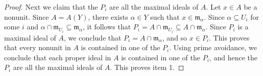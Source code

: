 \documentclass[preprint, 11pt,nonatbib]{elsarticle}
\theoremstyle{definition}
\numberwithin{theorem}{section}
\begin{document}
\begin{proof}

Next we claim that the $P_i$ are all the maximal ideals of $A$. 
Let $x \in A$ be a nonunit. Since $A = A (Y)$, there exists $\alpha \in Y$ such that $x \in \mathfrak{m}_{\alpha}$.
Since $\alpha \subseteq U_i$ for some $i$ and  $\alpha \cap \mathfrak{m}_{U_i} \subseteq \mathfrak{m}_{\alpha}$,
it follows that $ P_i = A \cap \mathfrak{m}_{U_i} \subseteq A \cap \mathfrak{m}_{\alpha}$.
Since $P_i$ is a maximal ideal of $A$, we conclude that  $P_i = A \cap \mathfrak{m}_{\alpha}$, and so $x \in P_i$. This proves that every nonunit in $A$ is contained in one of the $P_i$. Using prime avoidance, we conclude that each proper ideal in $A$ is contained in one of the $P_i$, and hence the $P_i$ are all the maximal ideals of $A$.  This proves item 1. 


 

  

\end{proof}
\end{document}
